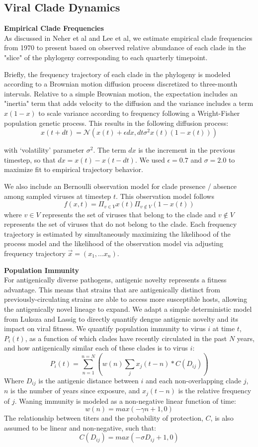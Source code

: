 \documentclass[11pt,oneside,letterpaper]{article}
\begin{document}
\subsection*{Viral Clade Dynamics}

\textbf{Empirical Clade Frequencies}\\
As discussed in Neher et al and Lee et al, we estimate empirical clade frequencies from 1970 to present based on observed relative abundance of each clade in the "slice" of the phylogeny corresponding to each quarterly timepoint.

Briefly, the frequency trajectory of each clade in the phylogeny is modeled according to a Brownian motion diffusion process discretized to three-month intervals.
Relative to a simple Brownian motion, the expectation includes an "inertia" term that adds velocity to the diffusion and the variance includes a term $x(1-x)$ to scale variance according to frequency following a Wright-Fisher population genetic process.
This results in the following diffusion process:
$$x(t+dt) = \mathcal{N}(x(t) + \epsilon dx, dt \sigma^2 x(t) (1-x(t)))$$

with ‘volatility’ parameter $\sigma^2$.
The term $dx$ is the increment in the previous timestep, so that $dx = x(t) - x(t-dt)$.
We used $\epsilon = 0.7$ and $\sigma = 2.0$ to maximize fit to empirical trajectory behavior.

We also include an Bernoulli observation model for clade presence / absence among sampled viruses at timestep $t$.
This observation model follows
$$f(x,t) = \Pi_{v \in V} x(t) \Pi_{v \notin V} (1-x(t))$$
where $v \in V$ represents the set of viruses that belong to the clade and $v \notin V$ represents the set of viruses that do not belong to the clade.
Each frequency trajectory is estimated by simultaneously
maximizing the likelihood of the process model and the likelihood
of the observation model via adjusting frequency trajectory $\vec{x} = (x_1, ... x_n)$.

\textbf{Population Immunity}\\
For antigenically diverse pathogens, antigenic novelty represents a fitness advantage.
This means that strains that are antigenically distinct from previously-circulating strains are able to access more susceptible hosts, allowing the antigenically novel lineage to expand.
We adapt a simple deterministic model from Luksza and Lassig to directly quantify dengue antigenic novelty and its impact on viral fitness.
We quantify population immunity to virus $i$ at time $t$, $P_i(t)$, as a function of which clades have recently circulated in the past $N$ years, and how antigenically similar each of these clades is to virus $i$:
$$P_i(t) = \sum_{n=1}^{n=N} (w(n)  \sum_{j} x_j(t-n) * C( D_{ij}))$$
Where $D_{ij}$ is the antigenic distance between $i$ and each non-overlapping clade $j$, $n$ is the number of years since exposure, and $x_j(t-n)$ is the relative frequency of $j$.
Waning immunity is modeled as a non-negative linear function of time:
$$w(n) = max(-\gamma n + 1, 0)$$
The relationship between titers and the probability of protection, $C$, is also assumed to be linear and non-negative, such that:
$$C(D_{ij}) = max(-\sigma D_{ij} + 1, 0)$$
\end{document}
